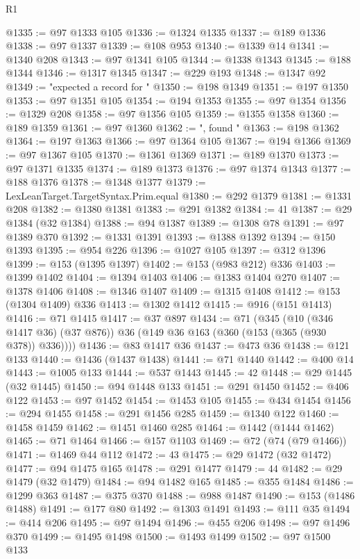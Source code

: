 \begin{lexlean}{R1}
\begin{coremodule}
{{{{{{{{{{{{{{{{{{{{{{{{{{{{{{{{{{{{{{{{{{{{{{{{{{{{{{{{{{{{{{{{{{{{{{{{{{{{{{{{{{{{{{{{{{{{{{{{{{{{{{{{{{{{{{{{{{{{{{{{{{{{{{{{{{{{{{{{{{{{{{{{{{{{{{{{{{{{{{{{{{{{{{{{{{{{{{{{{{{{{{{{{{@1335 := @97 @1333 @105
@1336 := @1324 @1335
@1337 := @189 @1336
@1338 := @97 @1337
@1339 := @108 @953
@1340 := @1339 @14
@1341 := @1340 @208
@1343 := @97 @1341 @105
@1344 := @1338 @1343
@1345 := @188 @1344
@1346 := @1317 @1345
@1347 := @229 @193
@1348 := @1347 @92
@1349 := "expected a record for "
@1350 := @198 @1349
@1351 := @197 @1350
@1353 := @97 @1351 @105
@1354 := @194 @1353
@1355 := @97 @1354
@1356 := @1329 @208
@1358 := @97 @1356 @105
@1359 := @1355 @1358
@1360 := @189 @1359
@1361 := @97 @1360
@1362 := ", found "
@1363 := @198 @1362
@1364 := @197 @1363
@1366 := @97 @1364 @105
@1367 := @194 @1366
@1369 := @97 @1367 @105
@1370 := @1361 @1369
@1371 := @189 @1370
@1373 := @97 @1371 @1335
@1374 := @189 @1373
@1376 := @97 @1374 @1343
@1377 := @188 @1376
@1378 := @1348 @1377
@1379 := LexLeanTarget.TargetSyntax.Prim.equal
@1380 := @292 @1379
@1381 := @1331 @208
@1382 := @1380 @1381
@1383 := @291 @1382
@1384 := 41
@1387 := @29 @1384 (@32 @1384)
@1388 := @94 @1387
@1389 := @1308 @78
@1391 := @97 @1389 @370
@1392 := @1331 @1391
@1393 := @1388 @1392
@1394 := @150 @1393
@1395 := @954 @226
@1396 := @1027 @105
@1397 := @312 @1396
@1399 := @153 (@1395 @1397)
@1402 := @153 (@983 @212) @336
@1403 := @1399 @1402
@1404 := @1394 @1403
@1406 := @1383 @1404 @270
@1407 := @1378 @1406
@1408 := @1346 @1407
@1409 := @1315 @1408
@1412 := @153 (@1304 @1409) @336
@1413 := @1302 @1412
@1415 := @916 (@151 @1413)
@1416 := @71 @1415
@1417 := @37 @897
@1434 := @71
    (@345
      (@10 (@346 @1417 @36) (@37 @876))
      @36
      (@149 @36 @163 (@360 (@153 (@365 (@930 @378)) @336))))
@1436 := @83 @1417 @36
@1437 := @473 @36
@1438 := @121 @133
@1440 := @1436 (@1437 @1438)
@1441 := @71 @1440
@1442 := @400 @14
@1443 := @1005 @133
@1444 := @537 @1443
@1445 := 42
@1448 := @29 @1445 (@32 @1445)
@1450 := @94 @1448 @133
@1451 := @291 @1450
@1452 := @406 @122
@1453 := @97 @1452
@1454 := @1453 @105
@1455 := @434 @1454
@1456 := @294 @1455
@1458 := @291 @1456 @285
@1459 := @1340 @122
@1460 := @1458 @1459
@1462 := @1451 @1460 @285
@1464 := @1442 (@1444 @1462)
@1465 := @71 @1464
@1466 := @157 @1103
@1469 := @72 (@74 (@79 @1466))
@1471 := @1469 @44 @112
@1472 := 43
@1475 := @29 @1472 (@32 @1472)
@1477 := @94 @1475 @165
@1478 := @291 @1477
@1479 := 44
@1482 := @29 @1479 (@32 @1479)
@1484 := @94 @1482 @165
@1485 := @355 @1484
@1486 := @1299 @363
@1487 := @375 @370
@1488 := @988 @1487
@1490 := @153 (@1486 @1488)
@1491 := @177 @80
@1492 := @1303 @1491
@1493 := @111 @35
@1494 := @414 @206
@1495 := @97 @1494
@1496 := @455 @206
@1498 := @97 @1496 @370
@1499 := @1495 @1498
@1500 := @1493 @1499
@1502 := @97 @1500 @133
}}}}}}}}}}}}}}}}}}}}}}}}}}}}}}}}}}}}}}}}}}}}}}}}}}}}}}}}}}}}}}}}}}}}}}}}}}}}}}}}}}}}}}}}}}}}}}}}}}}}}}}}}}}}}}}}}}}}}}}}}}}}}}}}}}}}}}}}}}}}}}}}}}}}}}}}}}}}}}}}}}}}}}}}}}}}}}}}}}}}}}}}}}
\end{coremodule}
\end{lexlean}
